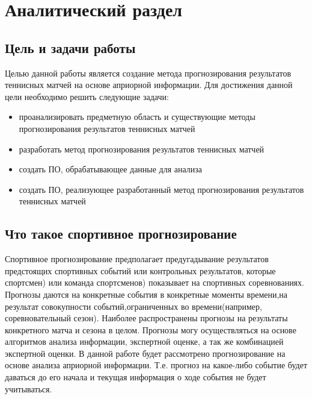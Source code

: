 \chapter{Аналитический раздел}
\label{cha:analysis}
\section{Цель и задачи работы}
Целью данной работы является создание метода прогнозирования результатов теннисных матчей на основе априорной информации.
Для достижения данной цели необходимо решить следующие задачи:
\begin{itemize}
	
\item проанализировать предметную область и существующие методы прогнозирования результатов теннисных матчей
	\item разработать метод прогнозирования результатов теннисных матчей
	\item создать ПО, обрабатывающее данные для анализа
	\item создать ПО, реализующее  разработанный метод прогнозирования результатов теннисных матчей
\end{itemize}
\section{Что такое спортивное прогнозирование}
Спортивное прогнозирование предполагает предугадывание результатов предстоящих спортивных событий или контрольных результатов, которые спортсмен) или команда спортсменов) показывает на спортивных соревнованиях\cite{Book01}. Прогнозы даются на конкретные события в конкретные моменты времени,на результат совокупности событий,ограниченных во времени(например, соревновательный сезон). Наиболее распространены прогнозы на результаты конкретного матча и сезона в целом. Прогнозы могу осуществляться на основе алгоритмов анализа информации, экспертной оценке, а так же комбинацией экспертной оценки. В данной работе будет рассмотрено прогнозирование на основе анализа априорной информации. Т.е. прогноз на какое-либо событие будет даваться до его начала и текущая информация о ходе события не будет учитываться.
